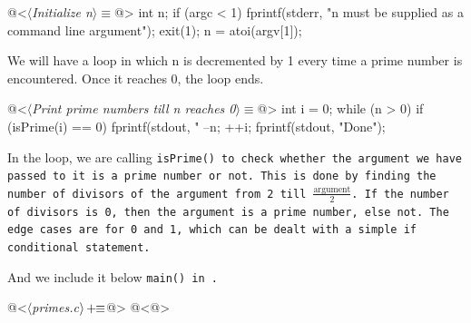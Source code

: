 \begin{code}[Initialize n]
@<$\langle$\textit{Initialize n}$\rangle\equiv$@>
int n;
if (argc < 1) {
    fprintf(stderr, "n must be supplied as a command line argument\n");
    exit(1);
}
n = atoi(argv[1]);
\end{code}

We will have a loop in which n is decremented by 1 every time a prime number is encountered. Once it reaches
0, the loop ends.

\begin{code}
@<$\langle$\textit{Print prime numbers till n reaches 0}$\rangle\equiv$@>
int i = 0;
while (n > 0) {
    if (isPrime(i) == 0) {
        fprintf(stdout, "%
        --n;
    }
    ++i;
}
fprintf(stdout, "Done\n");
\end{code}

In the loop, we are calling \tt isPrime() \rm to check whether the argument we have passed to it is a prime
number or not. This is done by finding the number of divisors of the argument from 2 till
$\frac{\text{argument}}{2}$. If the number of divisors is 0, then the argument is a prime number, else not.
The edge cases are for 0 and 1, which can be dealt with a simple \tt if \rm conditional statement.


And we include it below \tt main() in .

\begin{oldcode}
@<$\langle$\textit{primes.c}$\rangle \thinspace +\!\!\equiv$@>
@<@>
\end{oldcode}


